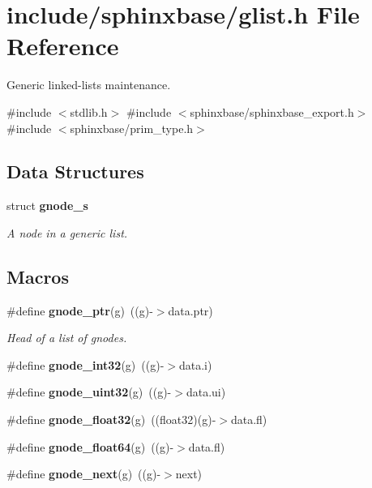 \section{include/sphinxbase/glist.h File Reference}
\label{glist_8h}


Generic linked-\/lists maintenance.  


{\ttfamily \#include $<$stdlib.\+h$>$}\newline
{\ttfamily \#include $<$sphinxbase/sphinxbase\+\_\+export.\+h$>$}\newline
{\ttfamily \#include $<$sphinxbase/prim\+\_\+type.\+h$>$}\newline
\subsection*{Data Structures}
\begin{DoxyCompactItemize}
\item 
struct \textbf{ gnode\+\_\+s}
\begin{DoxyCompactList}\small\item\em A node in a generic list. \end{DoxyCompactList}\end{DoxyCompactItemize}
\subsection*{Macros}
\begin{DoxyCompactItemize}
\item 
\#define \textbf{ gnode\+\_\+ptr}(g)~((g)-\/$>$data.\+ptr)
\begin{DoxyCompactList}\small\item\em Head of a list of gnodes. \end{DoxyCompactList}\item 
\mbox{\label{glist_8h_a7daab0205c40d1b449529ee4cc54522b}} 
\#define {\bfseries gnode\+\_\+int32}(g)~((g)-\/$>$data.\+i)
\item 
\mbox{\label{glist_8h_a3af0cc8d5d612e85fa433ac3edf42fd6}} 
\#define {\bfseries gnode\+\_\+uint32}(g)~((g)-\/$>$data.\+ui)
\item 
\mbox{\label{glist_8h_aaf6a2bdc69642303426c20fc0bdfa5f6}} 
\#define {\bfseries gnode\+\_\+float32}(g)~((float32)(g)-\/$>$data.\+fl)
\item 
\mbox{\label{glist_8h_abfea8eee77afc1e3046ef33ae6c0f5b4}} 
\#define {\bfseries gnode\+\_\+float64}(g)~((g)-\/$>$data.\+fl)
\item 
\mbox{\label{glist_8h_a33fc794db097ba2a5a36eba12c418993}} 
\#define {\bfseries gnode\+\_\+next}(g)~((g)-\/$>$next)
\end{DoxyCompactItemize}
